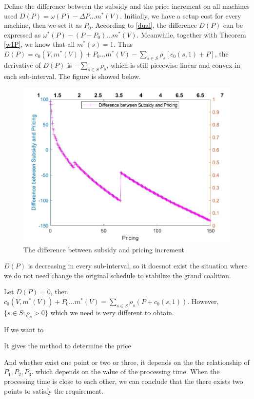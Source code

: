 Define the difference between the subsidy and the price increment on all machines used $D(P) = \omega(P) - \Delta P\dots m^*(V)$. Initially, we have a setup cost for every machine, then we set it as $P_0$.
According to \ref{dual}, the difference $D(P)$ can be expressed as $\omega^*(P) - (P-P_0)\dots m^*(V)$. Meanwhile, together with Theorem \ref{w1P}, we know that all $m^*(s) =1$. Thus $D(P) = c_0(V, m^*(V)) + P_0 \dots m^*(V) - \sum_{s\in S}\rho_s[c_0(s, 1) + P]$, the derivative of $D(P)$ is $-\sum_{s\in S}\rho_s$, which is still piecewise linear and convex in each sub-interval.
The figure is showed below.
\begin{figure}[h]%
	\centering  %
	\includegraphics[width=0.8\linewidth]{Figures/Imagediff}  %
	\caption{The difference between subsidy and pricing increment}  %
	\label{fig:Imagediff}   %
\end{figure}

$D(P)$ is decreasing in every sub-interval, so it doesnot exist the situation where we do not need change the original schedule to stabilize the grand coalition.

Let $D(P) = 0$, then $c_0(V, m^*(V)) + P_0 \dots m^*(V) = \sum_{s \in S} \rho_s (P + c_0(s,1))$. However, $\{s\in S: \rho_s > 0\}$ which we need is very different to obtain.

If we want to

It gives the method to determine the price

And whether exist one point or two or three, it depends on the the relationship of $P_1,P_2, P_3$.
which depends on the value of the processing time. When the processing time is close to each other, we can conclude that the there exists two points to satisfy the requirement.

